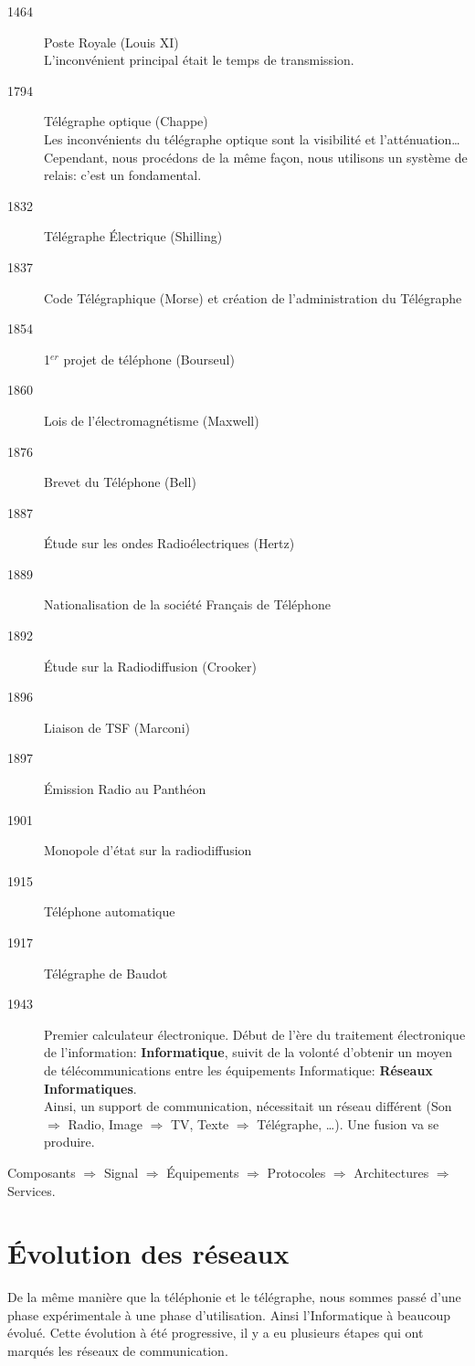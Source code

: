 \documentclass[12pt,a4paper,openany]{article}
\begin{document}
			\begin{description}
				\item[1464] Poste Royale (Louis XI)\\
					L'inconvénient principal était le temps de transmission.
				\item[1794] Télégraphe optique (Chappe)\\
			Les inconvénients du télégraphe optique sont la visibilité et l'atténuation\ldots Cependant, nous procédons de la même façon, nous utilisons un système de relais: c'est un fondamental.
				\item[1832] Télégraphe \'Electrique (Shilling)
				\item[1837] Code Télégraphique (Morse) et création de l'administration du Télégraphe
				\item[1854] 1$^{er}$ projet de téléphone (Bourseul)
				\item[1860] Lois de l'électromagnétisme (Maxwell)
				\item[1876] Brevet du Téléphone (Bell)
				\item[1887] \'Etude sur les ondes Radioélectriques (Hertz)
				\item[1889] Nationalisation de la société Français de Téléphone
				\item[1892] \'Etude sur la Radiodiffusion (Crooker)
				\item[1896] Liaison de TSF (Marconi)
				\item[1897] \'Emission Radio au Panthéon
				\item[1901] Monopole d'état sur la radiodiffusion
				\item[1915] Téléphone automatique
				\item[1917] Télégraphe de Baudot
				\item[1943] Premier calculateur électronique. Début de l'ère du traitement électronique de l'information: \textbf{Informatique}, 
					suivit de la volonté d'obtenir un moyen de télécommunications entre les équipements Informatique: \textbf{Réseaux Informatiques}.\\ Ainsi, un support de communication, nécessitait un réseau différent (Son $\Rightarrow$ Radio, Image $\Rightarrow$ TV, Texte $\Rightarrow$ Télégraphe, \ldots). Une fusion va se produire.
			\end{description}

			Composants $\Rightarrow$ Signal $\Rightarrow$ Équipements $\Rightarrow$ Protocoles $\Rightarrow$ Architectures $\Rightarrow$ Services.

	\section{\'Evolution des réseaux}
			De la même manière que la téléphonie et le télégraphe, nous sommes passé d'une phase expérimentale à une phase d'utilisation. Ainsi l'Informatique à beaucoup évolué. Cette évolution à été progressive, il y a eu plusieurs étapes qui ont marqués les réseaux de communication.
\end{document}

